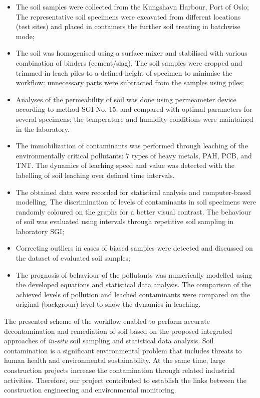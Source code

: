 \documentclass[algorithms,article,submit,pdftex,moreauthors]{Definitions/mdpi}
\begin{document}
\begin{itemize}
	\item The soil samples were collected from the Kungshavn Harbour, Port of Oslo; The representative soil specimens were excavated from different locations (test sites) and placed in containers the further soil treating in batchwise mode; 
	\item The soil was homogenised using a surface mixer and stabilised with various combination of binders (cement/slag). The soil samples were cropped and trimmed in leach piles to a defined height of specimen to minimise the workflow: unnecessary parts were subtracted from the samples using piles; 
	\item Analyses of the permeability of soil was done using permeameter device according to method SGI No. 15, and compared with optimal parameters for several specimens; the temperature and humidity conditions were maintained in the laboratory.
	\item The immobilization of contaminants was performed through leaching of the environmentally critical pollutants: 7 types of heavy metals, PAH, PCB, and TNT. The dynamics of leaching speed and value was detected with the labelling of soil leaching over defined time intervals. 
	\item The obtained data were recorded for statistical analysis and computer-based modelling. The discrimination of levels of contaminants in soil specimens were randomly coloured on the graphs for a better visual contrast. The behaviour of soil was evaluated using intervals through repetitive soil sampling in laboratory SGI; 
	\item Correcting outliers in cases of biased samples were detected and discussed on the dataset of evaluated soil samples; 
	\item The prognosis of behaviour of the pollutants was numerically modelled using the developed equations and statistical data analysis. The comparison of the achieved levels of pollution and leached contaminants were compared on the original (backgroun) level to show the dynamics in leaching.  
\end{itemize}

The presented scheme of the workflow enabled to perform accurate decontamination and remediation of soil based on the proposed integrated approaches of \emph{in-situ} soil sampling and statistical data analysis. Soil contamination is a significant environmental problem that includes  threats to human health and environmental sustainability. At the same time, large construction projects increase the contamination through related industrial activities. Therefore, our project contributed to establish the links between the construction engineering and environmental monitoring.
\end{document}
